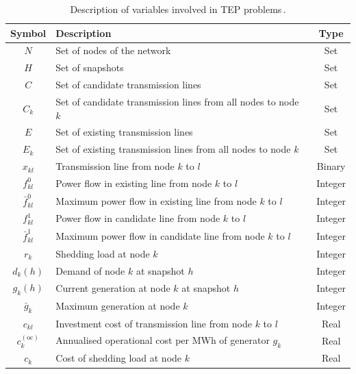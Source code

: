 \begin{table}[H]
\centering
\begin{tabular}{|c|l|c|} 
 \hline	
 \textbf{Symbol} & \textbf{Description} & \textbf{Type} \\
 \hline	
 $N$ & Set of nodes of the network & Set\\
  \hline	
  $H$ & Set of snapshots & Set\\
  \hline
 $C$ & Set of candidate transmission lines & Set\\
    \hline	
 $C_{k}$ & Set of candidate transmission lines from all nodes to node $k$ & Set\\
  \hline	
 $E$ & Set of existing transmission lines & Set\\
   \hline	
 $E_{k}$ & Set of existing transmission lines from all nodes to node $k$ & Set\\
  \hline	
 $x_{kl}$ & Transmission line from node $k$ to $l$ & Binary\\
    \hline	
 $f_{kl}^{0}$ & Power flow in existing line from node $k$ to $l$ & Integer\\
     \hline	
 $\bar{f}_{kl}^{0}$ & Maximum power flow in existing line from node $k$ to $l$ & Integer\\
   \hline	
 $f_{kl}^{1}$ & Power flow in candidate line from node $k$ to $l$ & Integer\\
  \hline
 $\bar{f}_{kl}^{1}$ & Maximum power flow in candidate line from node $k$ to $l$ & Integer\\
 \hline
  $r_{k}$ & Shedding load at node $k$ & Integer\\
  \hline	
 $d_{k}(h)$ & Demand of node $k$ at snapshot $h$ & Integer\\
  \hline	
 $g_{k}(h)$ & Current generation at node $k$ at snapshot $h$ & Integer\\
  \hline	
 $\bar{g}_{k}$ & Maximum generation at node $k$ & Integer\\
   \hline
  $c_{kl}$ & Investment cost of transmission line from node $k$ to $l$ & Real\\
  \hline	
  $c_{k}^{(\text{oc})}$ & Annualised operational cost per MWh of generator $g_{k}$ & Real\\
  \hline
  $c_{k}$ & Cost of shedding load at node $k$ & Real\\
  \hline
\end{tabular}
\caption{Description of variables involved in TEP problems\,\cite{Dilwali2016}.}
\label{table:TEPNomenclature}
\end{table}
